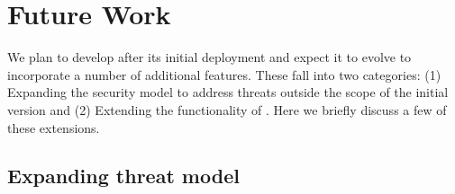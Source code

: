 \section{Future Work}
\label{sec:future}

We plan to develop \tc after its initial deployment and expect it to evolve to incorporate a number of additional features. These fall into two categories: (1) Expanding the security model to address threats outside the scope of the initial version and (2) Extending the functionality of \tc. Here we briefly discuss a few of these extensions.

\subsection{Expanding \tc threat model}

